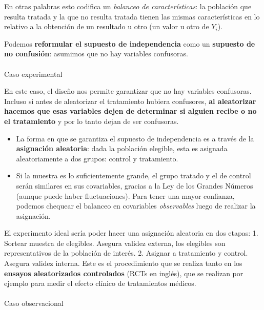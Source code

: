\documentclass[
  a4paper,
  DIV=11,
  numbers=noendperiod]{scrreprt}
\makeatletter
\let\oldparagraph\paragraph
\renewcommand{\paragraph}{
    \@ifstar
      \xxxParagraphStar
      \xxxParagraphNoStar
  }
\newcommand{\xxxParagraphStar}[1]{\oldparagraph*{#1}\mbox{}}
\newcommand{\xxxParagraphNoStar}[1]{\oldparagraph{#1}\mbox{}}
\providecommand{\tightlist}{%
  \setlength{\itemsep}{0pt}\setlength{\parskip}{0pt}}\usepackage{longtable,booktabs,array}
\makeatother
\begin{document}
En otras palabras esto codifica un \emph{balanceo de características}:
la población que resulta tratada y la que no resulta tratada tienen las
mismas características en lo relativo a la obtención de un resultado u
otro (un valor u otro de \(Y_i\)).

Podemos \textbf{reformular el supuesto de independencia} como un
\textbf{supuesto de no confusión}: asumimos que no hay variables
confusoras.

\paragraph{Caso experimental}\label{caso-experimental}

En este caso, el diseño nos permite garantizar que no hay variables
confusoras. Incluso si antes de aleatorizar el tratamiento hubiera
confusores, \textbf{al aleatorizar hacemos que esas variables dejen de
determinar si alguien recibe o no el tratamiento} y por lo tanto dejan
de ser confusoras.

\begin{itemize}
\tightlist
\item
  La forma en que se garantiza el supuesto de independencia es a través
  de la \textbf{asignación aleatoria}: dada la población elegible, esta
  es asignada aleatoriamente a dos grupos: control y tratamiento.
\item
  Si la muestra es lo suficientemente grande, el grupo tratado y el de
  control serán similares en sus covariables, gracias a la Ley de los
  Grandes Números (aunque puede haber fluctuaciones). Para tener una
  mayor confianza, podemos chequear el balanceo en covariables
  \emph{observables} luego de realizar la asignación.
\end{itemize}

El experimento ideal sería poder hacer una asignación aleatoria en dos
etapas: 1. Sortear muestra de elegibles. Asegura validez externa, los
elegibles son representativos de la población de interés. 2. Asignar a
tratamiento y control. Asegura validez interna. Este es el procedimiento
que se realiza tanto en los \textbf{ensayos aleatorizados controlados}
(RCTs en inglés), que se realizan por ejemplo para medir el efecto
clínico de tratamientos médicos.

\paragraph{Caso observacional}\label{caso-observacional}
\end{document}
